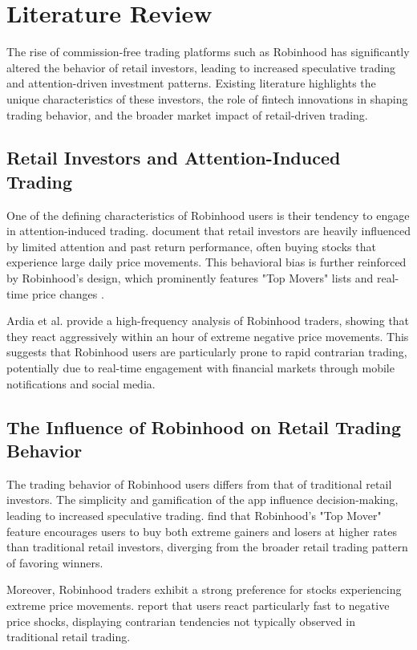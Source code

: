 \section{Literature Review}

The rise of commission-free trading platforms such as Robinhood has significantly altered the behavior of retail investors, leading to increased speculative trading and attention-driven investment patterns. Existing literature highlights the unique characteristics of these investors, the role of fintech innovations in shaping trading behavior, and the broader market impact of retail-driven trading.

\subsection{Retail Investors and Attention-Induced Trading}
One of the defining characteristics of Robinhood users is their tendency to engage in attention-induced trading. \cite{barber2011individual} document that retail investors are heavily influenced by limited attention and past return performance, often buying stocks that experience large daily price movements. This behavioral bias is further reinforced by Robinhood's design, which prominently features "Top Movers" lists and real-time price changes \cite{barber2021robinhood}. 

Ardia et al. \cite{ardia2023fast} provide a high-frequency analysis of Robinhood traders, showing that they react aggressively within an hour of extreme negative price movements. This suggests that Robinhood users are particularly prone to rapid contrarian trading, potentially due to real-time engagement with financial markets through mobile notifications and social media.

\subsection{The Influence of Robinhood on Retail Trading Behavior}
The trading behavior of Robinhood users differs from that of traditional retail investors. The simplicity and gamification of the app influence decision-making, leading to increased speculative trading. \cite{barber2021robinhood} find that Robinhood's "Top Mover" feature encourages users to buy both extreme gainers and losers at higher rates than traditional retail investors, diverging from the broader retail trading pattern of favoring winners.

Moreover, Robinhood traders exhibit a strong preference for stocks experiencing extreme price movements. \cite{ardia2023fast} report that users react particularly fast to negative price shocks, displaying contrarian tendencies not typically observed in traditional retail trading.

